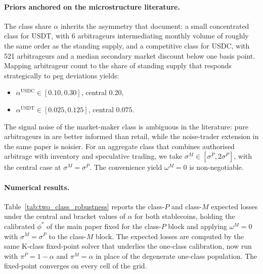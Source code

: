 \paragraph{Priors anchored on the microstructure literature.} The class share $\alpha$ inherits the asymmetry that \citet{ma_zeng_zhang_2025} document: a small concentrated class for USDT, with 6 arbitrageurs intermediating monthly volume of roughly the same order as the standing supply, and a competitive class for USDC, with 521 arbitrageurs and a median secondary market discount below one basis point. Mapping arbitrageur count to the share of standing supply that responds strategically to peg deviations yields:
\begin{itemize}
\item $\alpha^{\text{USDC}} \in [0.10, 0.30]$, central $0.20$,
\item $\alpha^{\text{USDT}} \in [0.025, 0.125]$, central $0.075$.
\end{itemize}
The signal noise of the market-maker class is ambiguous in the literature: pure arbitrageurs in \citet{ma_zeng_zhang_2025} are better informed than retail, while the noise-trader extension in the same paper is noisier. For an aggregate class that combines authorised arbitrage with inventory and speculative trading, we take $\sigma^M \in [\sigma^P, 2 \sigma^P]$, with the central case at $\sigma^M = \sigma^P$. The convenience yield $\omega^M = 0$ is non-negotiable.

\paragraph{Numerical results.} Table~\ref{tab:two_class_robustness} reports the class-$P$ and class-$M$ expected losses under the central and bracket values of $\alpha$ for both stablecoins, holding the calibrated $\phi^*$ of the main paper fixed for the class-$P$ block and applying $\omega^M = 0$ with $\sigma^M = \sigma^P$ to the class-$M$ block. The expected losses are computed by the same K-class fixed-point solver that underlies the one-class calibration, now run with $\pi^P = 1 - \alpha$ and $\pi^M = \alpha$ in place of the degenerate one-class population. The fixed-point converges on every cell of the grid.

